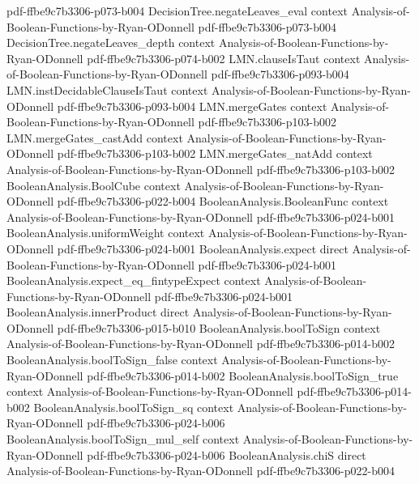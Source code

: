 \begin{theorem}
  {pdf-ffbe9c7b3306-p073-b004}
\proofstep
  {DecisionTree.negateLeaves_eval}
  {context}
  {Analysis-of-Boolean-Functions-by-Ryan-ODonnell}
  {pdf-ffbe9c7b3306-p073-b004}
\proofstep
  {DecisionTree.negateLeaves_depth}
  {context}
  {Analysis-of-Boolean-Functions-by-Ryan-ODonnell}
  {pdf-ffbe9c7b3306-p074-b002}
\proofstep
  {LMN.clauseIsTaut}
  {context}
  {Analysis-of-Boolean-Functions-by-Ryan-ODonnell}
  {pdf-ffbe9c7b3306-p093-b004}
\proofstep
  {LMN.instDecidableClauseIsTaut}
  {context}
  {Analysis-of-Boolean-Functions-by-Ryan-ODonnell}
  {pdf-ffbe9c7b3306-p093-b004}
\proofstep
  {LMN.mergeGates}
  {context}
  {Analysis-of-Boolean-Functions-by-Ryan-ODonnell}
  {pdf-ffbe9c7b3306-p103-b002}
\proofstep
  {LMN.mergeGates_castAdd}
  {context}
  {Analysis-of-Boolean-Functions-by-Ryan-ODonnell}
  {pdf-ffbe9c7b3306-p103-b002}
\proofstep
  {LMN.mergeGates_natAdd}
  {context}
  {Analysis-of-Boolean-Functions-by-Ryan-ODonnell}
  {pdf-ffbe9c7b3306-p103-b002}
\proofstep
  {BooleanAnalysis.BoolCube}
  {context}
  {Analysis-of-Boolean-Functions-by-Ryan-ODonnell}
  {pdf-ffbe9c7b3306-p022-b004}
\proofstep
  {BooleanAnalysis.BooleanFunc}
  {context}
  {Analysis-of-Boolean-Functions-by-Ryan-ODonnell}
  {pdf-ffbe9c7b3306-p024-b001}
\proofstep
  {BooleanAnalysis.uniformWeight}
  {context}
  {Analysis-of-Boolean-Functions-by-Ryan-ODonnell}
  {pdf-ffbe9c7b3306-p024-b001}
\proofstep
  {BooleanAnalysis.expect}
  {direct}
  {Analysis-of-Boolean-Functions-by-Ryan-ODonnell}
  {pdf-ffbe9c7b3306-p024-b001}
\proofstep
  {BooleanAnalysis.expect_eq_fintypeExpect}
  {context}
  {Analysis-of-Boolean-Functions-by-Ryan-ODonnell}
  {pdf-ffbe9c7b3306-p024-b001}
\proofstep
  {BooleanAnalysis.innerProduct}
  {direct}
  {Analysis-of-Boolean-Functions-by-Ryan-ODonnell}
  {pdf-ffbe9c7b3306-p015-b010}
\proofstep
  {BooleanAnalysis.boolToSign}
  {context}
  {Analysis-of-Boolean-Functions-by-Ryan-ODonnell}
  {pdf-ffbe9c7b3306-p014-b002}
\proofstep
  {BooleanAnalysis.boolToSign_false}
  {context}
  {Analysis-of-Boolean-Functions-by-Ryan-ODonnell}
  {pdf-ffbe9c7b3306-p014-b002}
\proofstep
  {BooleanAnalysis.boolToSign_true}
  {context}
  {Analysis-of-Boolean-Functions-by-Ryan-ODonnell}
  {pdf-ffbe9c7b3306-p014-b002}
\proofstep
  {BooleanAnalysis.boolToSign_sq}
  {context}
  {Analysis-of-Boolean-Functions-by-Ryan-ODonnell}
  {pdf-ffbe9c7b3306-p024-b006}
\proofstep
  {BooleanAnalysis.boolToSign_mul_self}
  {context}
  {Analysis-of-Boolean-Functions-by-Ryan-ODonnell}
  {pdf-ffbe9c7b3306-p024-b006}
\proofstep
  {BooleanAnalysis.chiS}
  {direct}
  {Analysis-of-Boolean-Functions-by-Ryan-ODonnell}
  {pdf-ffbe9c7b3306-p022-b004}

\end{theorem}
